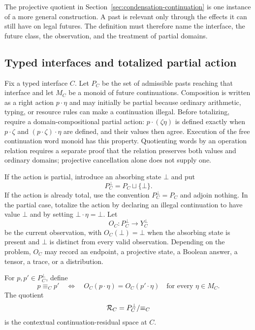 The projective quotient in Section~\ref{sec:condensation-continuation} is one
instance of a more general construction.  A past is relevant only through the
effects it can still have on legal futures.  The definition must therefore
name the interface, the future class, the observation, and the treatment of
partial domains.

\subsection{Typed interfaces and totalized partial action}

Fix a typed interface $C$.  Let $P_C$ be the set of admissible pasts reaching
that interface and let $M_C$ be a monoid of future continuations.  Composition
is written as a right action $p\cdot\eta$ and may initially be partial because
ordinary arithmetic, typing, or resource rules can make a continuation
illegal.  Before totalizing, require a domain-compositional partial action:
$p\cdot(\zeta\eta)$ is defined exactly when $p\cdot\zeta$ and
$(p\cdot\zeta)\cdot\eta$ are defined, and their values then agree.
Execution of the free continuation word monoid has this property.  Quotienting
words by an operation relation requires a separate proof that the relation
preserves both values and ordinary domains; projective cancellation alone does
not supply one.

If the action is partial, introduce an absorbing state $\bot$ and put
\[
  P_C^\bot=P_C\sqcup\{\bot\}.
\]
If the action is already total, use the convention $P_C^\bot=P_C$ and adjoin
nothing.  In the partial case, totalize the action by declaring an illegal
continuation to have value $\bot$ and by setting
$\bot\cdot\eta=\bot$.  Let
\[
  O_C:P_C^\bot\longrightarrow Y_C^\bot
\]
be the current observation, with $O_C(\bot)=\bot$ when the absorbing state
is present and $\bot$ is distinct from every valid observation.  Depending on the problem,
$O_C$ may record an endpoint, a projective state, a Boolean answer, a tensor, a
trace, or a distribution.

\begin{definition}
\label{def:contextual-equivalence}
For $p,p'\in P_C^\bot$, define
\begin{equation}
  p\equiv_C p'
  \quad\Longleftrightarrow\quad
  O_C(p\cdot\eta)=O_C(p'\cdot\eta)
  \quad\text{for every }\eta\in M_C.
  \label{eq:contextual-equivalence}
\end{equation}
The quotient
\[
  \mathcal R_C=P_C^\bot/{\equiv_C}
\]
is the contextual continuation-residual space at $C$.
\end{definition}

